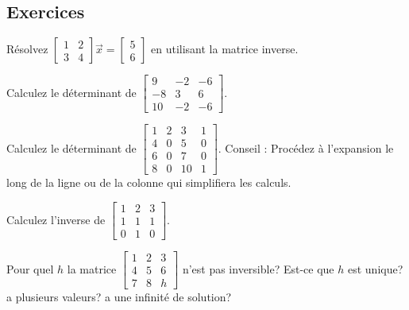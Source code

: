\subsection{Exercices}

\begin{exercise}
Résolvez
$\left[ \begin{smallmatrix}
1 & 2 \\
3 & 4 
\end{smallmatrix} \right] \vec{x} =
\left[ \begin{smallmatrix}
5 \\
6
\end{smallmatrix} \right]$ en utilisant la matrice inverse.
\end{exercise}

\begin{exercise}
Calculez le déterminant de
$\left[ \begin{smallmatrix}
9 & -2 & -6 \\
-8 & 3 & 6 \\
10 & -2 & -6
\end{smallmatrix} \right]$.
\end{exercise}

\begin{exercise}
Calculez le déterminant de
$\left[ \begin{smallmatrix}
1 & 2 & 3 & 1 \\
4 & 0 & 5 & 0 \\
6 & 0 & 7 & 0 \\
8 & 0 & 10 & 1
\end{smallmatrix} \right]$. Conseil : Procédez à l'expansion le long de la ligne ou de la colonne qui simplifiera les calculs.
\end{exercise}

\begin{exercise}
Calculez l'inverse de
$\left[ \begin{smallmatrix}
1 & 2 & 3 \\
1 & 1 & 1 \\
0 & 1 & 0
\end{smallmatrix} \right]$.
\end{exercise}

\begin{exercise}
Pour quel $h$ la matrice
$\left[ \begin{smallmatrix}
1 & 2 & 3 \\
4 & 5 & 6 \\
7 & 8 & h
\end{smallmatrix} \right]$
n'est pas inversible? Est-ce que $h$ est unique? a plusieurs valeurs? a une infinité de solution?
\end{exercise}

